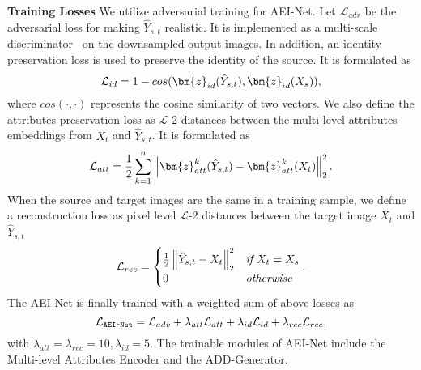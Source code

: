 \noindent\textbf{Training Losses}
We utilize adversarial training for AEI-Net.
Let $\mathcal{L}_{adv}$ be the adversarial loss for making $\hat{Y}_{s,t}$ realistic. It is implemented as a multi-scale discriminator~\cite{park2019semantic} on the downsampled output images.
In addition, an identity preservation loss is used to preserve the identity of the source. It is formulated as
\vspace{-0.5em}
\begin{equation}
\vspace{-0.5em}
\label{eqn:L_id}
\mathcal{L}_{id} =  1 - cos(\bm{z}_{id}(\hat{Y}_{s, t}), \bm{z}_{id}(X_s) ),
\end{equation}
where $cos(\cdot,\cdot)$ represents the cosine similarity of two vectors. 
We also define the attributes preservation loss as $\mathcal{L}$-2 distances between the multi-level attributes embeddings from $X_t$ and $\hat{Y}_{s,t}$.
It is formulated as
\vspace{-0.5em}
\begin{equation}
\vspace{-0.5em}
\label{eqn:L_att}
\mathcal{L}_{att} = \frac{1}{2} \sum_{k=1}^n \left\|\bm{z}_{att}^k(\hat{Y}_{s,t}) - \bm{z}_{att}^k(X_t)\right\|_2^2.
\end{equation}
When the source and target images are the same in a training sample, we define a reconstruction loss as pixel level $\mathcal{L}$-2 distances between the target image $X_t$ and $\hat{Y}_{s,t}$
\vspace{-0.5em}
\begin{equation}
\vspace{-0.5em}
\label{eqn:L_rec1}
\mathcal{L}_{rec} = 
\begin{cases}
\frac{1}{2} \left\|\hat{Y}_{s,t} - X_t\right\|_2^2 & \textit{if}~X_t = X_s \\
0 & \textit{otherwise}
\end{cases}.
\end{equation}
The AEI-Net is finally trained with a weighted sum of above losses as
\vspace{-0.5em}
\begin{equation}
\vspace{-0.5em}
\label{eqn:L_stage1}
\mathcal{L}_\texttt{AEI-Net} = \mathcal{L}_{adv} + \lambda_{att} \mathcal{L}_{att} + \lambda_{id} \mathcal{L}_{id}  + \lambda_{rec} \mathcal{L}_{rec},
\end{equation}
with $\lambda_{att}=\lambda_{rec}=10, \lambda_{id}=5$.
The trainable modules of AEI-Net include the Multi-level Attributes Encoder and the ADD-Generator.

